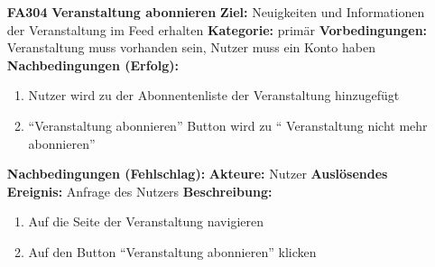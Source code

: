 \documentclass[parskip=full]{scrartcl}
\begin{document}
\begin{itemize}[nosep]
			\item[\textbf{FA304}]\textbf{Veranstaltung abonnieren}
			\newline \textbf{Ziel:} Neuigkeiten und Informationen der Veranstaltung im \gls{Feed} erhalten
			\newline \textbf{Kategorie:} primär
			\newline \textbf{Vorbedingungen:} Veranstaltung muss vorhanden sein, Nutzer muss ein Konto haben
			\newline \textbf{Nachbedingungen (Erfolg):} 
			\begin{enumerate}[nosep]
				\item Nutzer wird zu der Abonnentenliste der Veranstaltung hinzugefügt
				\item “Veranstaltung abonnieren” Button wird zu “ Veranstaltung nicht mehr abonnieren” 
			\end{enumerate}
			\textbf{Nachbedingungen (Fehlschlag):}
			\newline \textbf{Akteure:} Nutzer
			\newline \textbf{Auslösendes Ereignis:} Anfrage des Nutzers
			\newline \textbf{Beschreibung:}
			\begin{enumerate}[nosep]
				\item Auf die Seite der Veranstaltung navigieren
				\item Auf den Button “Veranstaltung abonnieren” klicken\\
			\end{enumerate}
						

\end{itemize}
\end{document}
